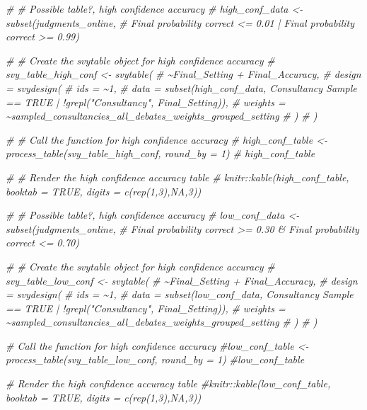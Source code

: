 \documentclass[
]{article}
\newenvironment{Shaded}{\begin{snugshade}}{\end{snugshade}}
\newcommand{\CommentTok}[1]{\textcolor[rgb]{0.56,0.35,0.01}{\textit{#1}}}
\begin{document}
\begin{Shaded}
\begin{Highlighting}[]
\CommentTok{\# \# Possible table?, high confidence accuracy}
\CommentTok{\# high\_conf\_data \textless{}{-} subset(judgments\_online, }
\CommentTok{\#                          \textasciigrave{}Final probability correct\textasciigrave{} \textless{}= 0.01 | \textasciigrave{}Final probability correct\textasciigrave{} \textgreater{}= 0.99)}

\CommentTok{\# \# Create the svytable object for high confidence accuracy}
\CommentTok{\# svy\_table\_high\_conf \textless{}{-} svytable(}
\CommentTok{\#   \textasciitilde{}Final\_Setting + Final\_Accuracy, }
\CommentTok{\#   design = svydesign(}
\CommentTok{\#     ids = \textasciitilde{}1, }
\CommentTok{\#     data = subset(high\_conf\_data, \textasciigrave{}Consultancy Sample\textasciigrave{} == TRUE | !grepl("Consultancy", Final\_Setting)),}
\CommentTok{\#     weights = \textasciitilde{}sampled\_consultancies\_all\_debates\_weights\_grouped\_setting}
\CommentTok{\#   )}
\CommentTok{\# )}

\CommentTok{\# \# Call the function for high confidence accuracy}
\CommentTok{\# high\_conf\_table \textless{}{-} process\_table(svy\_table\_high\_conf, round\_by = 1)}
\CommentTok{\# high\_conf\_table}

\CommentTok{\# \# Render the high confidence accuracy table}
\CommentTok{\# knitr::kable(high\_conf\_table, booktab = TRUE, digits = c(rep(1,3),NA,3))}






\CommentTok{\# \# Possible table?, high confidence accuracy}
\CommentTok{\# low\_conf\_data \textless{}{-} subset(judgments\_online, }
\CommentTok{\#                          \textasciigrave{}Final probability correct\textasciigrave{} \textgreater{}= 0.30 \& \textasciigrave{}Final probability correct\textasciigrave{} \textless{}= 0.70)}

\CommentTok{\# \# Create the svytable object for high confidence accuracy}
\CommentTok{\# svy\_table\_low\_conf \textless{}{-} svytable(}
\CommentTok{\#   \textasciitilde{}Final\_Setting + Final\_Accuracy, }
\CommentTok{\#   design = svydesign(}
\CommentTok{\#     ids = \textasciitilde{}1, }
\CommentTok{\#     data = subset(low\_conf\_data, \textasciigrave{}Consultancy Sample\textasciigrave{} == TRUE | !grepl("Consultancy", Final\_Setting)),}
\CommentTok{\#     weights = \textasciitilde{}sampled\_consultancies\_all\_debates\_weights\_grouped\_setting}
\CommentTok{\#   )}
\CommentTok{\# )}

\CommentTok{\# Call the function for high confidence accuracy}
\CommentTok{\#low\_conf\_table \textless{}{-} process\_table(svy\_table\_low\_conf, round\_by = 1)}
\CommentTok{\#low\_conf\_table}

\CommentTok{\# Render the high confidence accuracy table}
\CommentTok{\#knitr::kable(low\_conf\_table, booktab = TRUE, digits = c(rep(1,3),NA,3))}
\end{Highlighting}
\end{Shaded}
\end{document}
